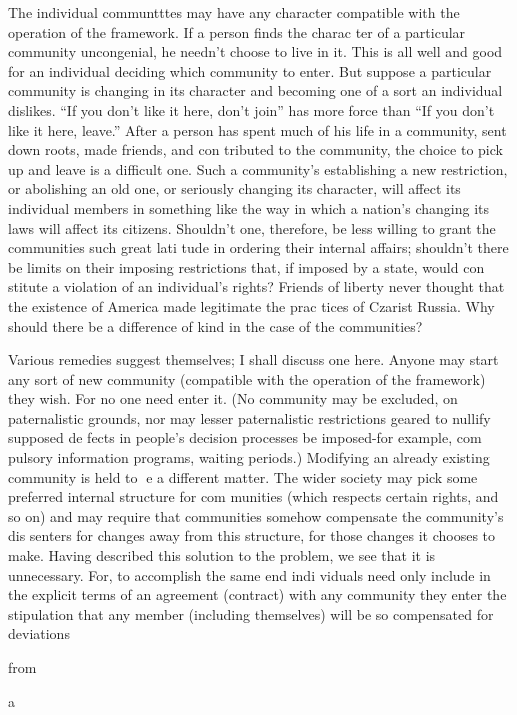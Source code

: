 \documentclass[11pt,openany]{book}
\begin{document}
The individual communtttes may have any character compatible with the operation of the framework. If a person finds the charac ter of a particular community uncongenial, he needn't choose to live in it. This is all well and good for an individual deciding which community to enter. But suppose a particular community is changing in its character and becoming one of a sort an individual dislikes. ``If you don't like it here, don't join'' has more force than ``If you don't like it here, leave.'' After a person has spent much of his life in a community, sent down roots, made friends, and con tributed to the community, the choice to pick up and leave is a difficult one. Such a community's establishing a new restriction, or abolishing an old one, or seriously changing its character, will affect its individual members in something like the way in which a nation's changing its laws will affect its citizens. Shouldn't one, therefore, be less willing to grant the communities such great lati tude in ordering their internal affairs; shouldn't there be limits on their imposing restrictions that, if imposed by a state, would con stitute a violation of an individual's rights? Friends of liberty never thought that the existence of America made legitimate the prac tices of Czarist Russia. Why should there be a difference of kind in the case of the communities? 

Various remedies suggest themselves; I shall discuss one here. Anyone may start any sort of new community (compatible with the operation of the framework) they wish. For no one need enter it. (No community may be excluded, on paternalistic grounds, nor may lesser paternalistic restrictions geared to nullify supposed de fects in people's decision processes be imposed-for example, com pulsory information programs, waiting periods.) Modifying an already existing community is held to e a different matter. The wider society may pick some preferred internal structure for com munities (which respects certain rights, and so on) and may require that communities somehow compensate the community's dis senters for changes away from this structure, for those changes it chooses to make. Having described this solution to the problem, we see that it is unnecessary. For, to accomplish the same end indi viduals need only include in the explicit terms of an agreement (contract) with any community they enter the stipulation that any member (including themselves) will be so compensated for deviations 

from 

a 
\end{document}
